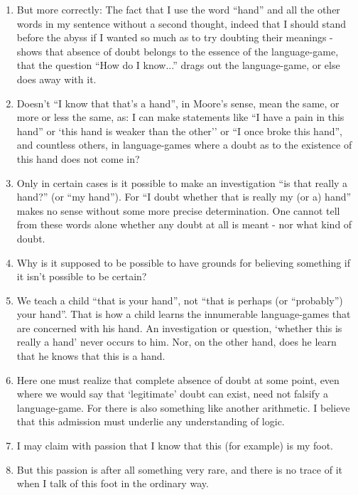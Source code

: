 \documentclass{book}
\begin{document}
\begin{enumerate}
\item
But more correctly: The fact that I use the word ``hand'' and all the other
words in my sentence without a second thought, indeed that I should stand
before the abyss if I wanted so much as to try doubting their meanings - shows
that absence of doubt belongs to the essence of the language-game, that the
question ``How do I know...'' drags out the language-game, or else does away
with it.

\item
Doesn't ``I know that that's a hand'', in Moore's sense, mean the same, or more
or less the same, as: I can make statements like ``I have a pain in this hand''
or `this hand is weaker than the other'' or ``I once broke this hand'', and
countless others, in language-games where a doubt as to the existence of this
hand does not come in?

\item
Only in certain cases is it possible to make an investigation ``is that really
a hand?'' (or ``my hand''). For ``I doubt whether that is really my (or a)
hand'' makes no sense without some more precise determination. One cannot tell
from these words alone whether any doubt at all is meant - nor what kind of
doubt.

\item
Why is it supposed to be possible to have grounds for believing something if it
isn't possible to be certain?

\item
We teach a child ``that is your hand'', not ``that is perhaps (or ``probably'')
your hand''. That is how a child learns the innumerable language-games that are
concerned with his hand. An investigation or question, `whether this is really
a hand' never occurs to him. Nor, on the other hand, does he learn that he
knows that this is a hand.

\item
Here one must realize that complete absence of doubt at some point, even where
we would say that `legitimate' doubt can exist, need not falsify a
language-game. For there is also something like another arithmetic.  I believe
that this admission must underlie any understanding of logic.

\item
I may claim with passion that I know that this (for example) is my foot.

\item
But this passion is after all something very rare, and there is no trace of it
when I talk of this foot in the ordinary way.


\end{enumerate}
\end{document}

